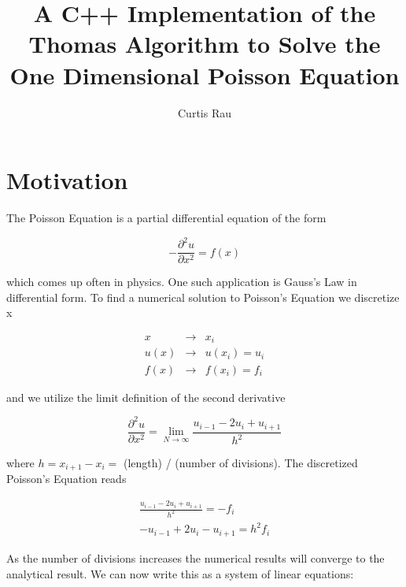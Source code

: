 \documentclass{article}
\author{Curtis Rau}
\title{A C++ Implementation of the Thomas Algorithm to Solve the One Dimensional Poisson Equation}
\begin{document}
\maketitle

\begin{abstract}

\end{abstract}


\section{Motivation}
The Poisson Equation is a partial differential equation of the form

\begin{equation}
	- \frac{\partial^2 u}{\partial x^2} = f(x)
\end{equation}

which comes up often in physics.  One such application is Gauss’s Law in differential form.  To find a numerical solution to Poisson’s Equation we discretize x

\begin{equation}
\begin{aligned}
	x    &\to & x_i          \\
	u(x) &\to & u(x_i) = u_i \\
	f(x) &\to & f(x_i) = f_i
\end{aligned}
\end{equation}

and we utilize the limit definition of the second derivative

\begin{equation}
	\frac{\partial^2 u}{\partial x^2} = \lim_{N \to \infty} \frac{u_{i-1} - 2 u_i + u_{i+1}}{h^2}
\end{equation}

where $h = x_{i+1} - x_i = $ (length) / (number of divisions).  The discretized Poisson’s Equation reads

\begin{equation}
\begin{aligned}
	\frac{u_{i-1} - 2 u_i + u_{i+1}}{h^2} = - f_i \\
	- u_{i-1} + 2 u_i - u_{i+1} = h^2 f_i
\end{aligned}
\end{equation}

As the number of divisions increases the numerical results will converge to the analytical result.  We can now write this as a system of linear equations:
\end{document}
